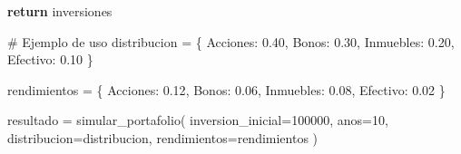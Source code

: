 \documentclass[
  doc,
  floatsintext,
  longtable,
  a4paper,
  nolmodern,
  notxfonts,
  notimes,
  12pt,
  colorlinks=true,linkcolor=blue,citecolor=blue,urlcolor=blue]{apa7}
\newenvironment{Shaded}{\begin{snugshade}}{\end{snugshade}}
\newcommand{\CommentTok}[1]{\textcolor[rgb]{0.37,0.37,0.37}{#1}}
\newcommand{\ControlFlowTok}[1]{\textcolor[rgb]{0.00,0.23,0.31}{\textbf{#1}}}
\newcommand{\DecValTok}[1]{\textcolor[rgb]{0.68,0.00,0.00}{#1}}
\newcommand{\FloatTok}[1]{\textcolor[rgb]{0.68,0.00,0.00}{#1}}
\newcommand{\NormalTok}[1]{\textcolor[rgb]{0.00,0.23,0.31}{#1}}
\newcommand{\OperatorTok}[1]{\textcolor[rgb]{0.37,0.37,0.37}{#1}}
\newcommand{\StringTok}[1]{\textcolor[rgb]{0.13,0.47,0.30}{#1}}
\begin{document}
\begin{Shaded}
\begin{Highlighting}[]
    \ControlFlowTok{return}\NormalTok{ inversiones}

\CommentTok{\# Ejemplo de uso}
\NormalTok{distribucion }\OperatorTok{=}\NormalTok{ \{}
    \StringTok{\textquotesingle{}Acciones\textquotesingle{}}\NormalTok{: }\FloatTok{0.40}\NormalTok{,}
    \StringTok{\textquotesingle{}Bonos\textquotesingle{}}\NormalTok{: }\FloatTok{0.30}\NormalTok{,}
    \StringTok{\textquotesingle{}Inmuebles\textquotesingle{}}\NormalTok{: }\FloatTok{0.20}\NormalTok{,}
    \StringTok{\textquotesingle{}Efectivo\textquotesingle{}}\NormalTok{: }\FloatTok{0.10}
\NormalTok{\}}

\NormalTok{rendimientos }\OperatorTok{=}\NormalTok{ \{}
    \StringTok{\textquotesingle{}Acciones\textquotesingle{}}\NormalTok{: }\FloatTok{0.12}\NormalTok{,}
    \StringTok{\textquotesingle{}Bonos\textquotesingle{}}\NormalTok{: }\FloatTok{0.06}\NormalTok{,}
    \StringTok{\textquotesingle{}Inmuebles\textquotesingle{}}\NormalTok{: }\FloatTok{0.08}\NormalTok{,}
    \StringTok{\textquotesingle{}Efectivo\textquotesingle{}}\NormalTok{: }\FloatTok{0.02}
\NormalTok{\}}

\NormalTok{resultado }\OperatorTok{=}\NormalTok{ simular\_portafolio(}
\NormalTok{    inversion\_inicial}\OperatorTok{=}\DecValTok{100000}\NormalTok{,}
\NormalTok{    anos}\OperatorTok{=}\DecValTok{10}\NormalTok{,}
\NormalTok{    distribucion}\OperatorTok{=}\NormalTok{distribucion,}
\NormalTok{    rendimientos}\OperatorTok{=}\NormalTok{rendimientos}
\NormalTok{)}
\end{Highlighting}
\end{Shaded}
\end{document}
